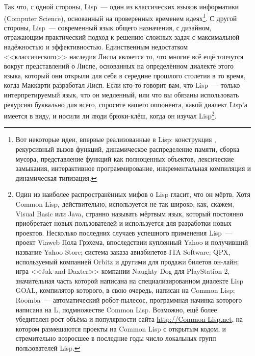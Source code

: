 Так что, с одной стороны, Lisp~--- один из классических языков информатики (Computer
Science), основанный на проверенных временем идеях\footnote{Вот некоторые идеи, впервые
  реализованные в Lisp: конструкция , рекурсивный вызов функций, динамическое
  распределение памяти, сборка мусора, представление функций как полноценных объектов,
  лексические замыкания, интерактивное программирование, инкрементальная компиляция и
  динамическая типизация.}. С другой стороны, Lisp~--- современный язык общего назначения,
с дизайном, отражающим практический подход к решению сложных задач с максимальной
надёжностью и эффективностью. Единственным недостатком <<классического>> наследия Лиспа
является то, что многие всё ещё топчутся вокруг представлений о Лиспе, основанных на
определённом диалекте этого языка, который они открыли для себя в середине прошлого
столетия в то время, когда Маккарти разработал Лисп. Если кто-то говорит вам, что Lisp~---
только интерпретируемый язык, что он медленный, или что вы обязаны использовать рекурсию
буквально для всего, спросите вашего оппонента, какой диалект Lisp'а имеется в видy, и
носили ли люди брюки-клёш, когда он изучал Lisp\footnote{Один из наиболее распространённых мифов
  о Lisp гласит, что он мёртв. Хотя Common Lisp, действительно, используется не так
  широко, как, скажем, Visual Basic или Java, странно называть мёртвым язык, который
  постоянно приобретает новых пользователей и используется для разработки новых
  проектов. Несколько последних случаев успешного применения Lisp~--- проект Viaweb Пола
  Грэхема, впоследствии купленный Yahoo и получивший название Yahoo Store; система
  заказа авиабилетов ITA Software;
  QPX, используемый компанией Orbitz и другими для
  продажи билетов он-лайн; игра <<Jak and Daxter>> компании Naughty Dog для PlayStation 2,
  значительная часть которой написана на специализированном диалекте Lisp GOAL, компилятор которого, в свою
  очередь, написан на Common Lisp; Roomba~--- автоматический робот-пылесос, программная
  начинка которого написана на L, подмножестве Common Lisp. Возможно, ещё более убедителен
  рост объёма и популярности сайта \url{http://Common-Lisp.net}, на котором
  размещаются проекты на Common Lisp с открытым кодом, и стремительно возросшее в
  последние годы число локальных групп пользователей Lisp.}.


